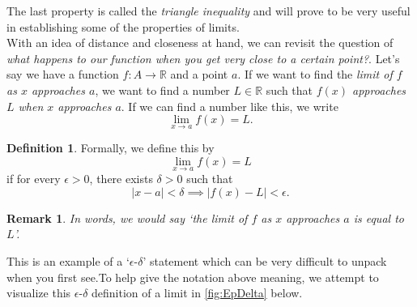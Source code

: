 \documentclass[12pt]{article}
\newcommand{\bbR}{\mathbb{R}}
\newcommand{\abs}[1]{ \left| #1 \right| }
\theoremstyle{definition}
\newtheorem{defn}[thm]{Definition}
\theoremstyle{plain}
\newtheorem{rem}[thm]{Remark}
\numberwithin{equation}{section}
\begin{document}
The last property is called the \emph{triangle inequality} and will prove to be very useful in establishing some of the properties of limits.\\




With an idea of distance and closeness at hand, we can revisit the question of \emph{what happens to our function when you get very close to a certain point?}. Let's say we have a function $f\colon A\to \bbR$ and a point $a$. If we want to find the \emph{limit of $f$ as $x$ approaches $a$}, we want to find a number $L\in\bbR$ such that \emph{$f(x)$ approaches $L$ when $x$ approaches $a$}. If we can find a number like this, we write
\begin{equation}
	\lim_{x\to a}f(x)=L.
\end{equation}
\begin{defn}\label{EpsDeltaDef}
	Formally, we define this by
	\begin{equation}
		\lim_{x\to a}f(x)=L
	\end{equation}
if for every $\epsilon>0$, there exists $\delta>0$ such that
\begin{equation*}
\abs{x-a}<\delta \implies \abs{f(x)-L}< \epsilon.
\end{equation*}
\end{defn}
\begin{rem}
  In words, we would say `the limit of $f$ as $x$ approaches $a$ is equal to $L$'.
\end{rem}

This is an example of a `$\epsilon$-$\delta$' statement which can be very difficult to unpack when you first see.To help give the notation above meaning, we attempt to visualize this $\epsilon$-$\delta$ definition of a limit in \cref{fig:EpDelta} below.
\end{document}
